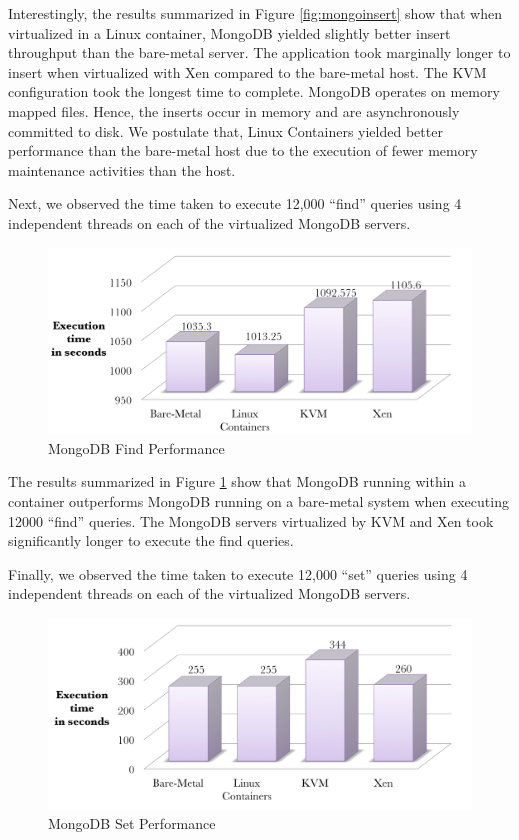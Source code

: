 Interestingly, the results summarized in Figure \ref{fig:mongoinsert} show that when virtualized in a Linux container, MongoDB yielded slightly better insert throughput than the bare-metal server. The application took marginally longer to insert when virtualized with Xen compared to the bare-metal host. The KVM configuration took the longest time to complete. MongoDB operates on memory mapped files. Hence, the inserts occur in memory and are asynchronously committed to disk. We postulate that, Linux Containers yielded better performance than the bare-metal host due to the execution of fewer memory maintenance activities than the host. 

Next, we observed the time taken to execute 12,000 ``find'' queries using 4 independent threads on each of the virtualized MongoDB servers.   

\begin{figure}[H]
\centering
\includegraphics[width=150mm]{mongofind.png}
\caption{MongoDB Find Performance}
\label{fig:mongofind}
\end{figure}

The results summarized in Figure \ref{fig:mongofind} show that MongoDB running within a container outperforms MongoDB running on a bare-metal system when executing 12000 ``find'' queries. The MongoDB servers virtualized by KVM and Xen took significantly longer to execute the find queries. 

Finally, we observed the time taken to execute 12,000 ``set'' queries using 4 independent threads on each of the virtualized MongoDB servers.

 
\begin{figure}[H]
\centering
\includegraphics[width=150mm]{mongoupdate.png}
\caption{MongoDB Set Performance}
\label{fig:mongoupdate}
\end{figure}


